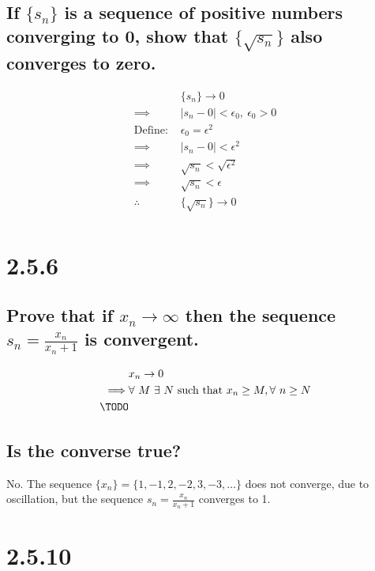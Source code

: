 \documentclass[11pt]{article}
\begin{document}
	\subsection*{If $\{s_n\}$ is a sequence of positive numbers converging to 0, show that $\{\sqrt{s_n}\}$ also converges to zero.}
	
	\begin{align*}
	&\{s_n\} \xrightarrow{} 0 \\
	\implies &|s_n - 0| < \epsilon_0,\ \epsilon_0 > 0 \\
	\text{Define: } &\epsilon_0 = \epsilon^2 \\
	\implies &|s_n - 0| < \epsilon^2 \\
	\implies &\sqrt{s_n} < \sqrt{\epsilon^2}  \\
	\implies &\sqrt{s_n} < \epsilon  \\
	\therefore\ &\{\sqrt{s_n}\} \xrightarrow{} 0\\
	\end{align*}
	
	\section*{2.5.6}
	\def \myfrac { \frac{x_n}{x_n + 1}}
	\subsection*{Prove that if $x_n \xrightarrow{} \infty $ then the sequence $s_n = \myfrac{}$ is convergent.}
	
	\begin{align*}
	&x_n \rightarrow 0 \\ 
	\implies &\forall\ M\ \exists\ N \text{ such that } x_n \geq M, \forall\ n \geq N \\ 
	\TODO   \\
	\end{align*}
	
	\subsection*{Is the converse true?}
	No. The sequence $\{x_n\} = \{1, -1, 2, -2, 3, -3, \ldots\}$ does not converge, due to oscillation, but the sequence $s_n = \myfrac{}$ converges to 1. 
	
	
	\section*{2.5.10}
	\def \myseq {n^p + \alpha_1n^{p-1} + \alpha_2n^{p-2} + \ldots + \alpha_p }
	\def \myseqworstcase {n^p - a_{*} (n^{p-1} + n^{p-2} + \dots + 1)}
	\def \myharmseq {\frac{1}{n} + \frac{1}{n^2} + \dots + \frac{1}{n^p}}
\end{document}
